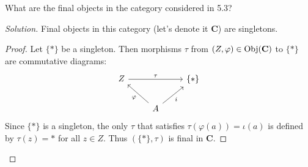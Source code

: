 \documentclass[12pt]{article}
\newenvironment{problem}[2][Problem]{\begin{trivlist}
\item[\hskip \labelsep {\bfseries #1}\hskip \labelsep {\bfseries #2.}]}{\end{trivlist}}
\newcommand{\catname}[1]{\normalfont\textbf{#1}}
\newcommand{\Objc}[1]{\text{Obj}(\catname{#1})}
\newenvironment{solution}
  {\renewcommand\qedsymbol{$\blacksquare$}\begin{proof}[Solution]}
{\end{proof}}
\newenvironment{sproof}{
  \renewcommand\qedsymbol{$\square$}
  \begin{proof}
  }{
  \end{proof}
}
\begin{document}
\newpage

\begin{problem}{5.5}
  What are the final objects in the category considered in 5.3?
\end{problem}
\begin{solution}
  Final objects in this category (let's denote it \catname{C}) are singletons.
  \begin{sproof}
    Let $\{*\}$ be a singleton.
    Then morphisms $\tau$ from $(Z, \varphi) \in \Objc{C}$ to $\{*\}$ are commutative diagrams:
    \[\begin{tikzcd}
        Z \ar{rr}{\tau} && \{*\} \\
        & A \ar{ul}{\varphi} \ar{ur}[swap]{i}
    \end{tikzcd}\]
    Since $\{*\}$ is a singleton, the only $\tau$ that satisfies
    $\tau(\varphi(a)) = \iota(a)$ is defined by $\tau(z) = *$ for all $z\in Z$.
    Thus $(\{*\}, \tau)$ is final in \catname{C}.
  \end{sproof}
\end{solution}
\end{document}
